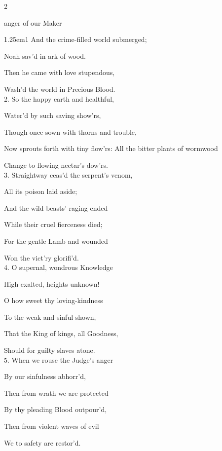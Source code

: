 \begin{paracol}{2}
\sloppy

\mattinsInvitatoryHymn
{} anger of our Maker


\begin{hangparas}{1.25em}{1}
And the crime-filled world submerged;

Noah sav'd in ark of wood.

Then he came with love stupendous,

Wash'd the world in Precious Blood.\\

2. So the happy earth and healthful,

Water'd by such saving show'rs,

Though once sown with thorns and trouble,

Now sprouts forth with tiny flow'rs:
All the bitter plants of wormwood

Change to flowing nectar's dow'rs.\\

3. Straightway ceas'd the serpent's venom,

All its poison laid aside;

And the wild beasts' raging ended

While their cruel fierceness died;

For the gentle Lamb and wounded

Won the vict'ry glorifi'd.\\

4. O supernal, wondrous Knowledge

High exalted, heights unknown!

O how sweet thy loving-kindness

To the weak and sinful shown,

That the King of kings, all Goodness,

Should for guilty slaves atone.\\

5. When we rouse the Judge's anger

By our sinfulness abhorr'd,

Then from wrath we are protected

By thy pleading Blood outpour'd,

Then from violent waves of evil

We to safety are restor'd.\\


\end{hangparas}
\end{paracol}
